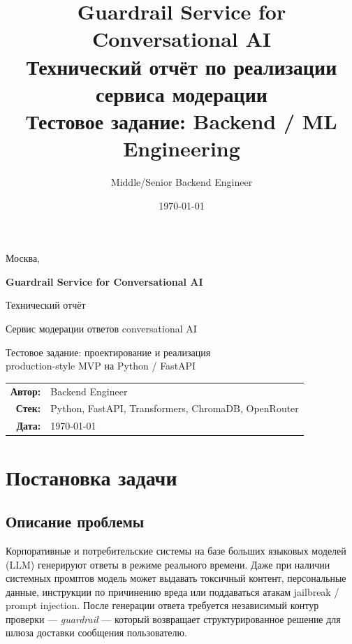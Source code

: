 \documentclass[12pt,a4paper]{report}
\title{%
  \textbf{Guardrail Service for Conversational AI}\\[0.4em]
  \large Технический отчёт по реализации сервиса модерации\\
  \large Тестовое задание: Backend / ML Engineering
}
\author{Middle/Senior Backend Engineer}
\date{\today}
\begin{document}
\begin{titlepage}
    \centering
    \vspace*{1.5cm}
    {\LARGE Москва, \the\year\par}
    \vspace{2cm}
    {\Huge\bfseries Guardrail Service for Conversational AI\par}
    \vspace{1.2cm}
    {\Large Технический отчёт\par}
    \vspace{0.8cm}
    {\large Сервис модерации ответов conversational AI\par}
    \vspace{0.5cm}
    {\normalsize Тестовое задание: проектирование и реализация\\
    production-style MVP на Python / FastAPI\par}
    \vfill
    \begin{tabular}{rl}
        \textbf{Автор:} & Backend Engineer \\
        \textbf{Стек:} & Python, FastAPI, Transformers, ChromaDB, OpenRouter \\
        \textbf{Дата:} & \today \\
    \end{tabular}
    \vspace{2cm}
\end{titlepage}

\tableofcontents
\clearpage
{}

\chapter{Постановка задачи}

\section{Описание проблемы}

Корпоративные и потребительские системы на базе больших языковых моделей (LLM)
генерируют ответы в режиме реального времени. Даже при наличии системных промптов
модель может выдавать токсичный контент, персональные данные, инструкции по причинению вреда
или поддаваться атакам jailbreak / prompt injection. После генерации ответа требуется
независимый контур проверки --- \emph{guardrail} --- который возвращает структурированное
решение для шлюза доставки сообщения пользователю.
\end{document}
